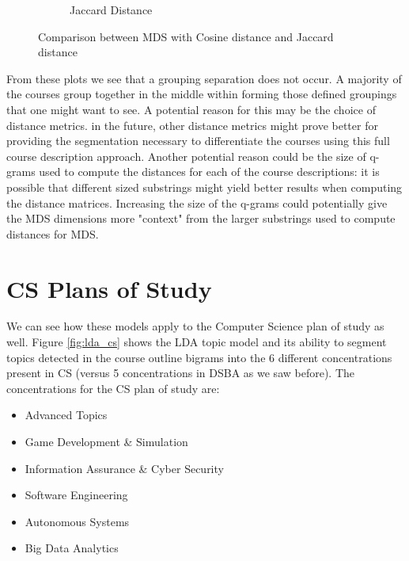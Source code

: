 \begin{figure}[H]
\begin{subfigure}{.5\textwidth}
  \caption{Jaccard Distance}
  \label{fig:jmds}
\end{subfigure}
\caption{Comparison between MDS with Cosine distance and Jaccard distance}
\label{fig:tile2}
\end{figure}

From these plots we see that a grouping separation does not occur.  A majority of the courses group together in the middle within forming those defined 
groupings that one might want to see. A potential reason for this may be the choice of distance metrics. in the future, other distance metrics might prove 
better for providing the segmentation necessary to differentiate the courses using this full course description approach.  Another potential reason could be 
the size of q-grams used to compute the distances for each of the course descriptions: it is possible that different sized substrings might yield better results 
when computing the distance matrices. Increasing the size of the q-grams could potentially give the MDS dimensions more "context" from the larger substrings 
used to compute distances for MDS. 





\section{CS Plans of Study}

We can see how these models apply to the Computer Science plan of study as well. Figure \ref{fig:lda_cs} shows the LDA topic 
model and its ability to segment topics detected in the course outline bigrams into the 6 different concentrations present in CS (versus 5 concentrations in 
DSBA as we saw before). 
The concentrations for the CS plan of study are: 

\begin{itemize}
  \item Advanced Topics  
  \item Game Development \& Simulation  
  \item Information Assurance \& Cyber Security  
  \item Software Engineering   
  \item Autonomous Systems  
  \item Big Data Analytics  
\end{itemize}


